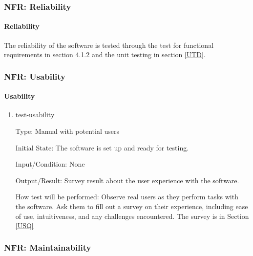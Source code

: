 \documentclass[12pt, titlepage]{article}
\begin{document}


\subsubsection{NFR: Reliability}\label{t_reliability}
		
\paragraph{Reliability}

The reliability of the software is tested through the test for functional requirements in section 4.1.2 and the unit testing in section \ref{UTD}.					

\subsubsection{NFR: Usability}\label{t_usability}
		
\paragraph{Usability}

\begin{enumerate}

\item{test-usability}

Type: Manual with potential users
					
Initial State: The software is set up and ready for testing.
					
Input/Condition: None
					
Output/Result: Survey result about the user experience with the software.
					
How test will be performed: Observe real users as they perform tasks with the software. Ask them to fill out a survey on their experience, including ease of use, intuitiveness, and any challenges encountered. The survey is in Section \ref{USQ}
\end{enumerate}

		
\subsubsection{NFR: Maintainability}\label{t_maintainability}
		
\end{document}

